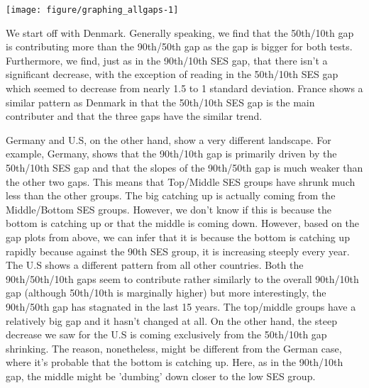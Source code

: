 \documentclass[11pt, a4paper]{article}\usepackage[]{graphicx}\usepackage[]{color}
\begin{document}
% 
% 
% 



{\centering \texttt{[image: figure/graphing\_allgaps-1]} 

}




We start off with Denmark. Generally speaking, we find that the 50th/10th gap is contributing more than the 90th/50th gap as the gap is bigger for both tests. Furthermore, we find, just as in the 90th/10th SES gap, that there isn't a significant decrease, with the exception of reading in the 50th/10th SES gap which seemed to decrease from nearly 1.5 to 1 standard deviation. France shows a similar pattern as Denmark in that the 50th/10th SES gap is the main contributer and that the three gaps have the similar trend. 

Germany and U.S, on the other hand, show a very different landscape. For example, Germany, shows that the 90th/10th gap is primarily driven by the 50th/10th SES gap and that the slopes of the 90th/50th gap is much weaker than the other two gaps. This means that Top/Middle SES groups have shrunk much less than the other groups. The big catching up is actually coming from the Middle/Bottom SES groups. However, we don't know if this is because the bottom is catching up or that the middle is coming down. However, based on the gap plots from above, we can infer that it is because the bottom is catching up rapidly because against the 90th SES group, it is increasing steeply every year. The U.S shows a different pattern from all other countries. Both the 90th/50th/10th gaps seem to contribute rather similarly to the overall 90th/10th gap (although 50th/10th is marginally higher) but more interestingly, the 90th/50th gap has stagnated in the last 15 years. The top/middle groups have a relatively big gap and it hasn't changed at all. On the other hand, the steep decrease we saw for the U.S is coming exclusively from the 50th/10th gap shrinking. The reason, nonetheless, might be different from the German case, where it's probable that the bottom is catching up. Here, as in the 90th/10th gap, the middle might be 'dumbing' down closer to the low SES group.
\end{document}
